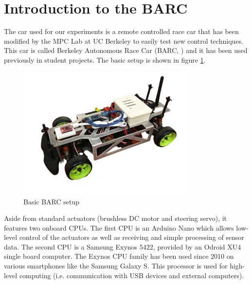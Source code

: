 \section{Introduction to the BARC}
The car used for our experiments is a remote controlled race car that has been modified by the MPC Lab at UC Berkeley to easily test new control techniques. This car is called Berkeley Autonomous Race Car (BARC, \cite{BARC}) and it has been used previously in student projects. The basic setup is shown in figure \ref{fig:BARC}.
\begin{figure}[ht]
    \centering
  \includegraphics[width=0.8\textwidth]{../../Figures/BARC/IMG_1047.pdf}
    \caption{Basic BARC setup}
    \label{fig:BARC}
\end{figure}

Aside from standard actuators (brushless DC motor and steering servo), it features two onboard CPUs. The first CPU is an Arduino Nano which allows low-level control of the actuators as well as receiving and simple processing of sensor data. The second CPU is a Samsung Exynos 5422, provided by an Odroid XU4 single board computer. The Exynos CPU family has been used since 2010 on various smartphones like the Samsung Galaxy S. This processor is used for high-level computing (i.e. communication with USB devices and external computers).
